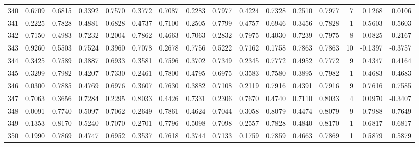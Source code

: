 \begin{tabular}{lrrrrrrrrrrrrrrr}
340 &      0.6709 &  0.6815 &  0.3392 &  0.7570 &  0.3772 &  0.7087 &  0.2283 &  0.7977 &  0.4224 &  0.7328 &   0.2510 &     0.7977 &      7 &                    0.1268 &                     0.0106 \\
341 &      0.2225 &  0.7828 &  0.4881 &  0.6828 &  0.4737 &  0.7100 &  0.2505 &  0.7799 &  0.4757 &  0.6946 &   0.3456 &     0.7828 &      1 &                    0.5603 &                     0.5603 \\
342 &      0.7150 &  0.4983 &  0.7232 &  0.2004 &  0.7862 &  0.4663 &  0.7063 &  0.2832 &  0.7975 &  0.4030 &   0.7239 &     0.7975 &      8 &                    0.0825 &                    -0.2167 \\
343 &      0.9260 &  0.5503 &  0.7524 &  0.3960 &  0.7078 &  0.2678 &  0.7756 &  0.5222 &  0.7162 &  0.1758 &   0.7863 &     0.7863 &     10 &                   -0.1397 &                    -0.3757 \\
344 &      0.3425 &  0.7589 &  0.3887 &  0.6933 &  0.3581 &  0.7596 &  0.3702 &  0.7349 &  0.2345 &  0.7772 &   0.4952 &     0.7772 &      9 &                    0.4347 &                     0.4164 \\
345 &      0.3299 &  0.7982 &  0.4207 &  0.7330 &  0.2461 &  0.7800 &  0.4795 &  0.6975 &  0.3583 &  0.7580 &   0.3895 &     0.7982 &      1 &                    0.4683 &                     0.4683 \\
346 &      0.0300 &  0.7885 &  0.4769 &  0.6976 &  0.3607 &  0.7630 &  0.3882 &  0.7108 &  0.2119 &  0.7916 &   0.4391 &     0.7916 &      9 &                    0.7616 &                     0.7585 \\
347 &      0.7063 &  0.3656 &  0.7284 &  0.2295 &  0.8033 &  0.4426 &  0.7331 &  0.2306 &  0.7670 &  0.4740 &   0.7110 &     0.8033 &      4 &                    0.0970 &                    -0.3407 \\
348 &      0.0091 &  0.7740 &  0.5097 &  0.7062 &  0.2649 &  0.7861 &  0.4624 &  0.7044 &  0.3058 &  0.8079 &   0.4474 &     0.8079 &      9 &                    0.7988 &                     0.7649 \\
349 &      0.1353 &  0.8170 &  0.5240 &  0.7070 &  0.2701 &  0.7796 &  0.5098 &  0.7098 &  0.2557 &  0.7828 &   0.4840 &     0.8170 &      1 &                    0.6817 &                     0.6817 \\
350 &      0.1990 &  0.7869 &  0.4747 &  0.6952 &  0.3537 &  0.7618 &  0.3744 &  0.7133 &  0.1759 &  0.7859 &   0.4663 &     0.7869 &      1 &                    0.5879 &                     0.5879 \\

\end{tabular}
